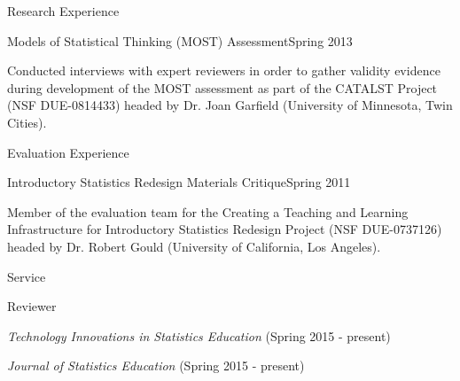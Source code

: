 \documentclass{resume} %
\begin{document}


\begin{rSection}{Research Experience}
	
	
	\begin{rSubsection}{Models of Statistical Thinking (MOST) Assessment}{Spring 2013}{}{}
		\item[] Conducted interviews with expert reviewers in order to gather validity evidence during development of the MOST assessment as part of the CATALST Project (NSF DUE-0814433) headed by Dr. Joan Garfield (University of Minnesota, Twin Cities).
		
	\end{rSubsection}
	
	
\end{rSection}



\begin{rSection}{Evaluation Experience}
	
	
	\begin{rSubsection}{Introductory Statistics Redesign Materials Critique}{Spring 2011}{}{}
		\item[] Member of the evaluation team for the Creating a Teaching and Learning Infrastructure for Introductory Statistics Redesign Project (NSF DUE-0737126) headed by Dr. Robert Gould (University of California, Los Angeles). 
		
	\end{rSubsection}
	
	
\end{rSection}


\begin{rSection}{Service}
	
	
	\begin{rSubsection}{Reviewer}{}{}{}
		\item[] \textit{Technology Innovations in Statistics Education} (Spring 2015 - present)
		\item[] \textit{Journal of Statistics Education} (Spring 2015 - present)

	\end{rSubsection}
	
	
\end{rSection}
\end{document}
